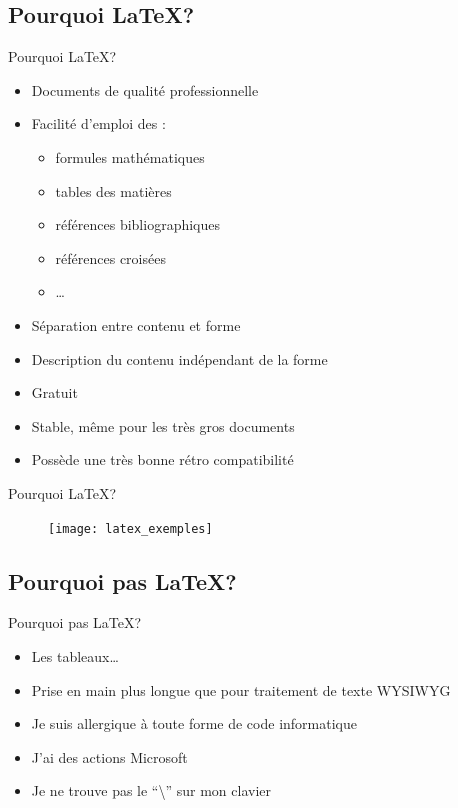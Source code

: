 \documentclass[10pt,svgnames,usenames,table]{beamer} %
\begin{document}
\subsection{Pourquoi \LaTeX{}?}
\begin{frame}{Pourquoi \LaTeX{}?}

  \begin{itemize}
  	\item Documents de qualité professionnelle
	\item Facilité d'emploi des :
	\begin{itemize}
		\item formules mathématiques
		\item tables des matières
		\item références bibliographiques
		\item références croisées
        \item \ldots{}
	\end{itemize}
	\item Séparation entre contenu et forme
	\item Description du contenu indépendant de la forme
	\item Gratuit
	\item Stable, même pour les très gros documents
	\item Possède une très bonne rétro compatibilité
  \end{itemize}
\end{frame}

\begin{frame}{Pourquoi \LaTeX{}?}

\begin{figure}[htbp]
\begin{center}
\texttt{[image: latex\_exemples]}
\end{center}
\end{figure}
\end{frame}

\subsection{Pourquoi pas \LaTeX{}?}
\begin{frame}{Pourquoi pas \LaTeX{}?}

  \begin{itemize}
    \item Les tableaux\ldots{}
	\item Prise en main plus longue que pour traitement de texte WYSIWYG
	\item Je suis allergique à toute forme de code informatique
	\item J'ai des actions Microsoft
	\item Je ne trouve pas le ``\textbackslash'' sur mon clavier
  \end{itemize}
\end{frame}
\end{document}
